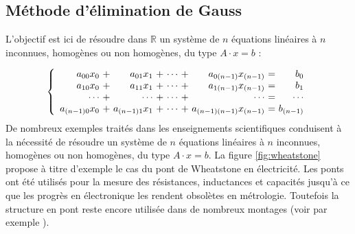 \subsection{Méthode d'élimination de {\sc Gauss}}\label{gauss}
L'objectif est ici de 
résoudre dans $\mathbb{R}$ un système de $n$ équations linéaires
à $n$ inconnues, homogènes ou non homogènes, du type $A\cdot x = b$ :

\begin{equation}\label{eq1}
\left\{
\begin{array}{r@{\ +\ }r@{\ +\ }r@{\ +\ }r@{\ =\ }r}
a_{00}x_0     & a_{01}x_1     & \cdots & a_{0(n-1)}x_{(n-1)}     & b_0      \\
a_{10}x_0     & a_{11}x_1     & \cdots & a_{1(n-1)}x_{(n-1)}     & b_1      \\
\cdots        & \cdots        & \cdots & \cdots                  & \cdots   \\
a_{(n-1)0}x_0 & a_{(n-1)1}x_1 & \cdots & a_{(n-1)(n-1)}x_{(n-1)} & b_{(n-1)}
\end{array}
\right.
\end{equation}
De nombreux exemples traités dans les enseignements scientifiques
conduisent à la nécessité de résoudre un système de $n$ équations linéaires
à $n$ inconnues, homogènes ou non homogènes, du type $A\cdot x = b$. 
La figure \ref{fig:wheatstone}
propose à titre d'exemple le cas du pont de Wheatstone en électricité.
Les ponts ont été utilisés pour la mesure des résistances, inductances et
capacités jusqu'à ce que les progrès en électronique les rendent obsolètes en
métrologie. Toutefois la structure en pont reste encore utilisée dans de 
nombreux montages (voir par exemple \cite{rousseau07})\label{cite:rousseau}.

